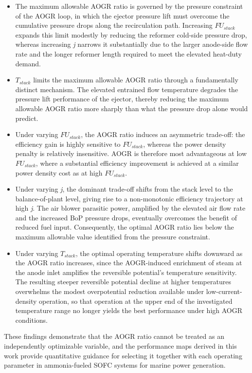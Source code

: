 \documentclass[a4paper,10pt]{cas-dc} %
\begin{document}
\begin{itemize}
\item The maximum allowable AOGR ratio is governed by the pressure constraint of the AOGR loop, in which the ejector pressure lift must overcome the cumulative pressure drops along the recirculation path.
Increasing \({FU}_{stack}\) expands this limit modestly by reducing the reformer cold-side pressure drop, whereas increasing \emph{j} narrows it substantially due to the larger anode-side flow rate and the longer reformer length required to meet the elevated heat-duty demand.
\item \(T_{stack}\) limits the maximum allowable AOGR ratio through a fundamentally distinct mechanism.
The elevated entrained flow temperature degrades the pressure lift performance of the ejector, thereby reducing the maximum allowable AOGR ratio more sharply than what the pressure drop alone would predict.
\item Under varying \({FU}_{stack}\), the AOGR ratio induces an asymmetric trade-off: the efficiency gain is highly sensitive to \({FU}_{stack}\), whereas the power density penalty is relatively insensitive.
AOGR is therefore most advantageous at low \({FU}_{stack}\), where a substantial efficiency improvement is achieved at a similar power density cost as at high \({FU}_{stack}\).
\item Under varying \emph{j}, the dominant trade-off shifts from the stack level to the balance-of-plant level, giving rise to a non-monotonic efficiency trajectory at high \emph{j}.
The air blower parasitic power, amplified by the elevated air flow rate and the increased BoP pressure drops, eventually overcomes the benefit of reduced fuel input.
Consequently, the optimal AOGR ratio lies below the maximum allowable value identified from the pressure constraint.
\item Under varying \(T_{stack}\), the optimal operating temperature shifts downward as the AOGR ratio increases, since the AOGR-induced enrichment of steam at the anode inlet amplifies the reversible potential's temperature sensitivity.
The resulting steeper reversible potential decline at higher temperatures overwhelms the modest overpotential reduction available under low-current-density operation, so that operation at the upper end of the investigated temperature range no longer yields the best performance under high AOGR conditions.
\end{itemize}

These findings demonstrate that the AOGR ratio cannot be treated as an independently optimizable variable, and the performance maps derived in this work provide quantitative guidance for selecting it together with each operating parameter in ammonia-fueled SOFC systems for marine power generation.
\end{document}
